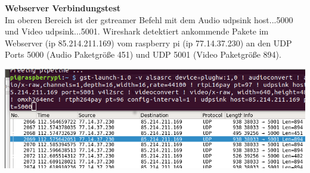 \textbf{Webserver Verbindungstest}\\
Im oberen Bereich ist der gstreamer Befehl mit dem Audio udpsink host...5000 und Video udpsink...5001. Wireshark detektiert ankommende Pakete im Webserver (ip 85.214.211.169) vom raspberry pi (ip 77.14.37.230) an den UDP Ports 5000 (Audio Paketgröße 451) und UDP 5001 (Video Paketgröße 894).\\

\begin{minipage}{\textwidth}
    \begin{center}
        \includegraphics[scale=0.7]{img/wireshark.png} 
    \end{center}
\end{minipage}
